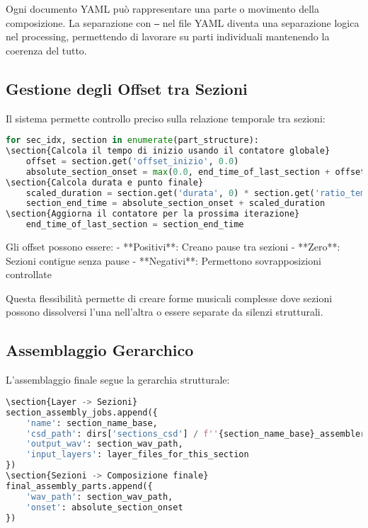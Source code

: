 Ogni documento YAML può rappresentare una parte o movimento della composizione. La separazione con \texttt{---} nel file YAML diventa una separazione logica nel processing, permettendo di lavorare su parti individuali mantenendo la coerenza del tutto.
\subsection{Gestione degli Offset tra Sezioni}
Il sistema permette controllo preciso sulla relazione temporale tra sezioni:

\begin{lstlisting}[language=Python]
for sec_idx, section in enumerate(part_structure):
\section{Calcola il tempo di inizio usando il contatore globale}
    offset = section.get('offset_inizio', 0.0)
    absolute_section_onset = max(0.0, end_time_of_last_section + offset)
\section{Calcola durata e punto finale}
    scaled_duration = section.get('durata', 0) * section.get('ratio_temporale', 1.0)
    section_end_time = absolute_section_onset + scaled_duration
\section{Aggiorna il contatore per la prossima iterazione}
    end_time_of_last_section = section_end_time
\end{lstlisting}

Gli offset possono essere:
- **Positivi**: Creano pause tra sezioni
- **Zero**: Sezioni contigue senza pause
- **Negativi**: Permettono sovrapposizioni controllate

Questa flessibilità permette di creare forme musicali complesse dove sezioni possono dissolversi l'una nell'altra o essere separate da silenzi strutturali.
\subsection{Assemblaggio Gerarchico}
L'assemblaggio finale segue la gerarchia strutturale:

\begin{lstlisting}[language=Python]
\section{Layer -> Sezioni}
section_assembly_jobs.append({
    'name': section_name_base,
    'csd_path': dirs['sections_csd'] / f''{section_name_base}_assembler.csd'',
    'output_wav': section_wav_path,
    'input_layers': layer_files_for_this_section
})
\section{Sezioni -> Composizione finale}
final_assembly_parts.append({
    'wav_path': section_wav_path,
    'onset': absolute_section_onset
})
\end{lstlisting}

